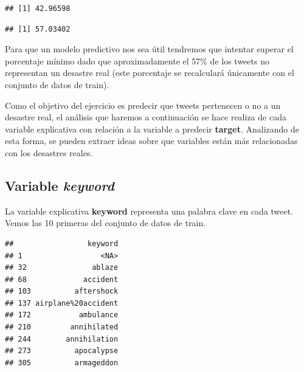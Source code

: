 \documentclass[
]{article}
\newenvironment{Shaded}{\begin{snugshade}}{\end{snugshade}}
\newcommand{\DecValTok}[1]{\textcolor[rgb]{0.00,0.00,0.81}{#1}}
\newcommand{\KeywordTok}[1]{\textcolor[rgb]{0.13,0.29,0.53}{\textbf{#1}}}
\newcommand{\NormalTok}[1]{#1}
\newcommand{\OperatorTok}[1]{\textcolor[rgb]{0.81,0.36,0.00}{\textbf{#1}}}
\newcommand{\StringTok}[1]{\textcolor[rgb]{0.31,0.60,0.02}{#1}}
\begin{document}
\begin{verbatim}
## [1] 42.96598
\end{verbatim}

\begin{Shaded}
\end{Shaded}

\begin{verbatim}
## [1] 57.03402
\end{verbatim}

Para que un modelo predictivo nos sea útil tendremos que intentar
superar el porcentaje mínimo dado que aproximadamente el 57\% de los
tweets no representan un desastre real (este porcentaje se recalculará
únicamente con el conjunto de datos de train).

Como el objetivo del ejercicio es predecir que tweets pertenecen o no a
un desastre real, el análisis que haremos a continuación se hace realiza
de cada variable explicativa con relación a la variable a predecir
\textbf{target}. Analizando de esta forma, se pueden extraer ideas sobre
que variables están más relacionadas con los desastres reales.

\hypertarget{variable-keyword}{%
\subsection{\texorpdfstring{Variable
\emph{keyword}}{Variable keyword}}\label{variable-keyword}}

La variable explicativa \textbf{keyword} representa una palabra clave en
cada tweet. Vemos las 10 primeras del conjunto de datos de train.

\begin{Shaded}
\end{Shaded}

\begin{verbatim}
##                 keyword
## 1                  <NA>
## 32               ablaze
## 68             accident
## 103          aftershock
## 137 airplane%20accident
## 172           ambulance
## 210         annihilated
## 244        annihilation
## 273          apocalypse
## 305          armageddon
\end{verbatim}
\end{document}
